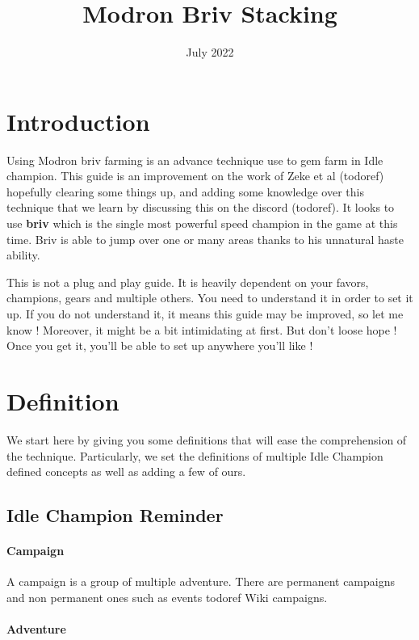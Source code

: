 \documentclass{article}
\title{Modron Briv Stacking}
\date{July 2022}
\begin{document}
\maketitle

\section{Introduction}

Using Modron briv farming is an advance technique use to gem farm in Idle champion.
This guide is an improvement on the work of Zeke et al (todoref) hopefully clearing some things up, and adding some knowledge over this technique that we learn by discussing this on the discord (todoref).
It looks to use \textbf{briv} which is the single most powerful speed champion in the game at this time.
Briv is able to jump over one or many areas thanks to his unnatural haste ability.

This is not a plug and play guide.
It is heavily dependent on your favors, champions, gears and multiple others.
You need to understand it in order to set it up.
If you do not understand it, it means this guide may be improved, so let me know !
Moreover, it might be a bit intimidating at first.
But don't loose hope !
Once you get it, you'll be able to set up anywhere you'll like !


\section{Definition}

We start here by giving you some definitions that will ease the comprehension of the technique.
Particularly, we set the definitions of multiple Idle Champion defined concepts as well as adding a few of ours.

\subsection{Idle Champion Reminder}

\paragraph{Campaign}
A campaign is a group of multiple adventure.
There are permanent campaigns and non permanent ones such as events todoref Wiki campaigns.




\paragraph{Adventure}
\end{document}
